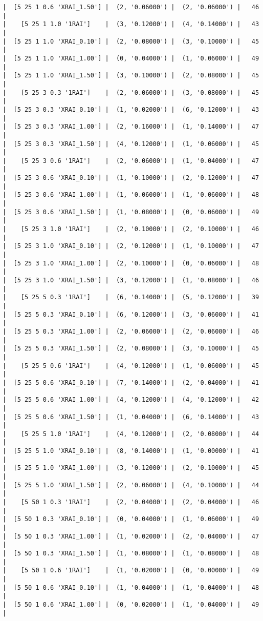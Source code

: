 \documentclass{article}
\begin{document}
\begin{verbatim}
|  [5 25 1 0.6 'XRAI_1.50'] |  (2, '0.06000') |  (2, '0.06000') |   46  |
|    [5 25 1 1.0 '1RAI']    |  (3, '0.12000') |  (4, '0.14000') |   43  |
|  [5 25 1 1.0 'XRAI_0.10'] |  (2, '0.08000') |  (3, '0.10000') |   45  |
|  [5 25 1 1.0 'XRAI_1.00'] |  (0, '0.04000') |  (1, '0.06000') |   49  |
|  [5 25 1 1.0 'XRAI_1.50'] |  (3, '0.10000') |  (2, '0.08000') |   45  |
|    [5 25 3 0.3 '1RAI']    |  (2, '0.06000') |  (3, '0.08000') |   45  |
|  [5 25 3 0.3 'XRAI_0.10'] |  (1, '0.02000') |  (6, '0.12000') |   43  |
|  [5 25 3 0.3 'XRAI_1.00'] |  (2, '0.16000') |  (1, '0.14000') |   47  |
|  [5 25 3 0.3 'XRAI_1.50'] |  (4, '0.12000') |  (1, '0.06000') |   45  |
|    [5 25 3 0.6 '1RAI']    |  (2, '0.06000') |  (1, '0.04000') |   47  |
|  [5 25 3 0.6 'XRAI_0.10'] |  (1, '0.10000') |  (2, '0.12000') |   47  |
|  [5 25 3 0.6 'XRAI_1.00'] |  (1, '0.06000') |  (1, '0.06000') |   48  |
|  [5 25 3 0.6 'XRAI_1.50'] |  (1, '0.08000') |  (0, '0.06000') |   49  |
|    [5 25 3 1.0 '1RAI']    |  (2, '0.10000') |  (2, '0.10000') |   46  |
|  [5 25 3 1.0 'XRAI_0.10'] |  (2, '0.12000') |  (1, '0.10000') |   47  |
|  [5 25 3 1.0 'XRAI_1.00'] |  (2, '0.10000') |  (0, '0.06000') |   48  |
|  [5 25 3 1.0 'XRAI_1.50'] |  (3, '0.12000') |  (1, '0.08000') |   46  |
|    [5 25 5 0.3 '1RAI']    |  (6, '0.14000') |  (5, '0.12000') |   39  |
|  [5 25 5 0.3 'XRAI_0.10'] |  (6, '0.12000') |  (3, '0.06000') |   41  |
|  [5 25 5 0.3 'XRAI_1.00'] |  (2, '0.06000') |  (2, '0.06000') |   46  |
|  [5 25 5 0.3 'XRAI_1.50'] |  (2, '0.08000') |  (3, '0.10000') |   45  |
|    [5 25 5 0.6 '1RAI']    |  (4, '0.12000') |  (1, '0.06000') |   45  |
|  [5 25 5 0.6 'XRAI_0.10'] |  (7, '0.14000') |  (2, '0.04000') |   41  |
|  [5 25 5 0.6 'XRAI_1.00'] |  (4, '0.12000') |  (4, '0.12000') |   42  |
|  [5 25 5 0.6 'XRAI_1.50'] |  (1, '0.04000') |  (6, '0.14000') |   43  |
|    [5 25 5 1.0 '1RAI']    |  (4, '0.12000') |  (2, '0.08000') |   44  |
|  [5 25 5 1.0 'XRAI_0.10'] |  (8, '0.14000') |  (1, '0.00000') |   41  |
|  [5 25 5 1.0 'XRAI_1.00'] |  (3, '0.12000') |  (2, '0.10000') |   45  |
|  [5 25 5 1.0 'XRAI_1.50'] |  (2, '0.06000') |  (4, '0.10000') |   44  |
|    [5 50 1 0.3 '1RAI']    |  (2, '0.04000') |  (2, '0.04000') |   46  |
|  [5 50 1 0.3 'XRAI_0.10'] |  (0, '0.04000') |  (1, '0.06000') |   49  |
|  [5 50 1 0.3 'XRAI_1.00'] |  (1, '0.02000') |  (2, '0.04000') |   47  |
|  [5 50 1 0.3 'XRAI_1.50'] |  (1, '0.08000') |  (1, '0.08000') |   48  |
|    [5 50 1 0.6 '1RAI']    |  (1, '0.02000') |  (0, '0.00000') |   49  |
|  [5 50 1 0.6 'XRAI_0.10'] |  (1, '0.04000') |  (1, '0.04000') |   48  |
|  [5 50 1 0.6 'XRAI_1.00'] |  (0, '0.02000') |  (1, '0.04000') |   49  |

\end{verbatim}
\end{document}
